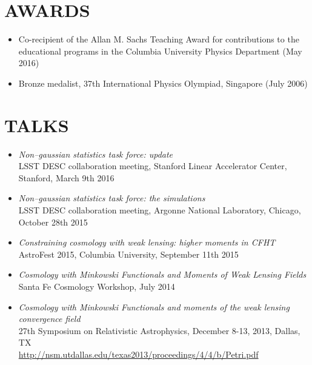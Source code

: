 \documentclass[margin]{res} %
\begin{document}
\begin{resume}

\section{AWARDS}
\begin{itemize}
\item Co-recipient of the Allan M. Sachs Teaching Award for contributions to the educational programs in the Columbia University Physics Department (May 2016)
\item Bronze medalist, 37th International Physics Olympiad, Singapore (July 2006) 
\end{itemize}


\section{TALKS}
\begin{itemize}

\item {\sl  Non--gaussian statistics task force: update}\\
LSST DESC collaboration meeting, Stanford Linear Accelerator Center, Stanford, March 9th 2016

\item {\sl  Non--gaussian statistics task force: the simulations}\\
LSST DESC collaboration meeting, Argonne National Laboratory, Chicago, October 28th 2015

\item {\sl Constraining cosmology with weak lensing: higher moments in CFHT}\\
AstroFest 2015, Columbia University, September 11th 2015

\item {\sl Cosmology with Minkowski Functionals and Moments of Weak Lensing Fields}\\
Santa Fe Cosmology Workshop, July 2014

\item{\sl Cosmology with Minkowski Functionals and moments of the weak lensing convergence field}\\
27th Symposium on Relativistic Astrophysics, December 8-13, 2013, Dallas, TX \\
\url{http://nsm.utdallas.edu/texas2013/proceedings/4/4/b/Petri.pdf}


\end{itemize}


\end{resume}
\end{document}
